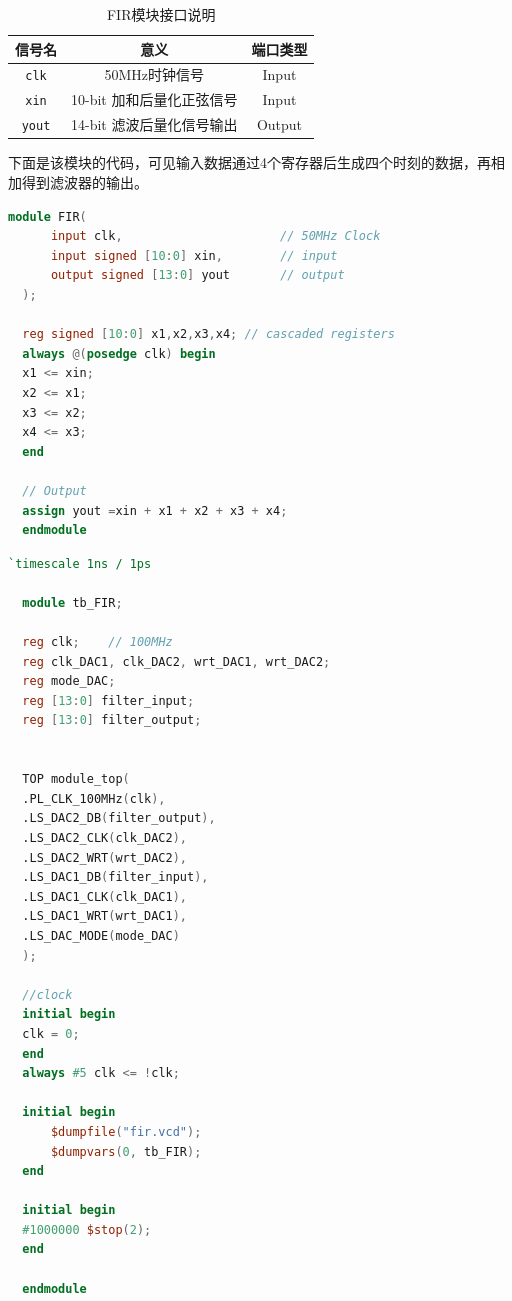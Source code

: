 \documentclass[lang=cn,newtx,10pt,scheme=chinese]{elegantbook}
\begin{document}
\begin{table}[htbp]
  \centering
  \begin{tabular}{ccc}
    \toprule
     信号名 & 意义 & 端口类型\\
    \midrule
      \texttt{clk} & 50MHz时钟信号 & Input \\
     \texttt{xin} & 10-bit 加和后量化正弦信号 & Input \\
     \texttt{yout} & 14-bit 滤波后量化信号输出 & Output \\
    \bottomrule
  \end{tabular}
  \caption{FIR模块接口说明}
  \label{table:interface_fir}
\end{table}

下面是该模块的代码，可见输入数据通过4个寄存器后生成四个时刻的数据，再相加得到滤波器的输出。
\begin{lstlisting}[language=verilog,caption={FIR滤波器模块}]
module FIR(
      input clk,                      // 50MHz Clock
      input signed [10:0] xin,        // input
      output signed [13:0] yout       // output
  );
  
  reg signed [10:0] x1,x2,x3,x4; // cascaded registers
  always @(posedge clk) begin
  x1 <= xin; 
  x2 <= x1; 
  x3 <= x2; 
  x4 <= x3;
  end
  
  // Output
  assign yout =xin + x1 + x2 + x3 + x4; 
  endmodule
  \end{lstlisting}
\begin{lstlisting}[language=verilog, caption={Testbench文件}]
  `timescale 1ns / 1ps

  module tb_FIR;
  
  reg clk;    // 100MHz
  reg clk_DAC1, clk_DAC2, wrt_DAC1, wrt_DAC2;
  reg mode_DAC;
  reg [13:0] filter_input;
  reg [13:0] filter_output;
  
  
  TOP module_top(
  .PL_CLK_100MHz(clk), 
  .LS_DAC2_DB(filter_output),
  .LS_DAC2_CLK(clk_DAC2),
  .LS_DAC2_WRT(wrt_DAC2),
  .LS_DAC1_DB(filter_input),
  .LS_DAC1_CLK(clk_DAC1),
  .LS_DAC1_WRT(wrt_DAC1),
  .LS_DAC_MODE(mode_DAC)
  );
  
  //clock
  initial begin
  clk = 0; 
  end 
  always #5 clk <= !clk;    
  
  initial begin
      $dumpfile("fir.vcd");
      $dumpvars(0, tb_FIR);
  end
  
  initial begin
  #1000000 $stop(2);
  end
  
  endmodule
  
\end{lstlisting}
\end{document}
